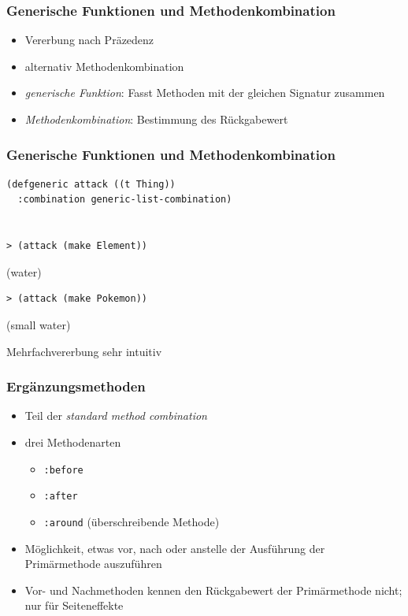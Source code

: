 \documentclass{beamer}
\newcommand{\rsymbol}{\vspace{-0.25cm}\hspace{5pt}\footnotesize\color{blue}\ttfamily\textquotesingle}
\begin{document}
\begin{frame}
 \frametitle{Generische Funktionen und Methodenkombination}
 \begin{itemize}
  \item Vererbung nach Präzedenz
  \item alternativ Methodenkombination
  \item \emph{generische Funktion}: Fasst Methoden mit der gleichen Signatur zusammen
  \item \emph{Methodenkombination}: Bestimmung des Rückgabewert
 \end{itemize}
\end{frame}

\begin{frame}[fragile]
 \frametitle{Generische Funktionen und Methodenkombination}
\begin{lstlisting}
(defgeneric attack ((t Thing))
  :combination generic-list-combination)

  
> (attack (make Element))
\end{lstlisting}\vspace{0.6cm}
{\rsymbol (water)}
\begin{lstlisting}
> (attack (make Pokemon))
\end{lstlisting}\vspace{0.6cm}
{\rsymbol (small water)}

\vspace{1cm}
\textbf{\textrightarrow} Mehrfachvererbung sehr intuitiv
\end{frame}

\begin{frame}
 \frametitle{Ergänzungsmethoden}
 \begin{itemize}
  \item Teil der \emph{standard method combination}
  \item drei Methodenarten
  \begin{itemize}
   \item \texttt{:before}
   \item \texttt{:after}
   \item \texttt{:around} (überschreibende Methode)
  \end{itemize}
  \item Möglichkeit, etwas vor, nach oder anstelle der Ausführung der Primärmethode auszuführen
  \item Vor- und Nachmethoden kennen den Rückgabewert der Primärmethode nicht; nur für Seiteneffekte
 \end{itemize}
\end{frame}
\end{document}
